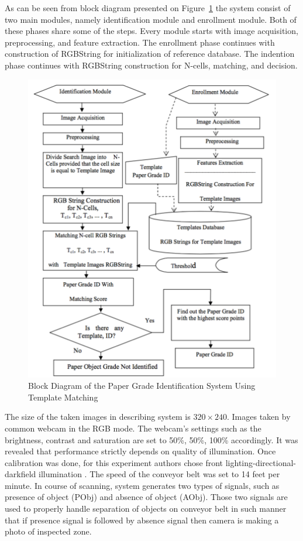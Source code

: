 \documentclass{lutmscthesis}[2010/09/22]
\begin{document}
As can be seen from block diagram presented on Figure~\ref{afig:tempmatch}
the system consist of two main modules, namely identification module
and enrollment module. Both of these phases share some of the steps.
Every module starts with image acquisition, preprocessing,
and feature extraction. The enrollment phase continues with construction
of RGBString for initialization of reference database.
The indention phase continues with RGBString construction
for N-cells, matching, and decision.

\begin{figure}[htp]
  {\par\centering
  \includegraphics[width=1\textwidth]{tempmatch}
  \par}
  \caption{Block Diagram of the Paper Grade Identification
          System Using Template Matching~\cite{Rahman:2009}}
  \label{afig:tempmatch}
\end{figure}

The size of the taken images in describing system is $320\times240$. Images
taken by common webcam in the RGB mode. The webcam's settings such as
the brightness, contrast and saturation are set to 50\%, 50\%, 100\%
accordingly. It was revealed that performance strictly depends on
quality of illumination. Once calibration was done, for this
experiment authors chose front lighting-directional-darkfield
illumination \cite{Pham:2003}. The speed of the conveyor belt
was set to 14 feet per minute. In course of scanning, system
generates two types of signals, such as presence of object (PObj) and
absence of object (AObj). Those two signals are used to properly
handle separation of objects on conveyor belt in such manner that if presence
signal is followed by absence signal then camera is making a photo
of inspected zone.
\end{document}
